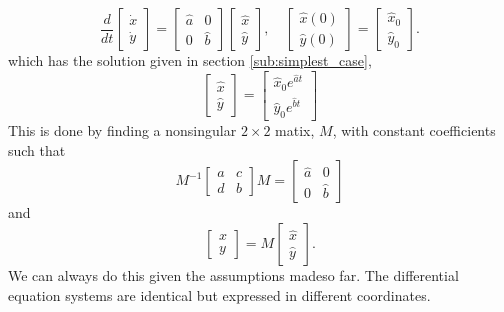 \begin{equation*}
\frac{d}{dt}
\begin{bmatrix}
\dot{x}\\
\dot{y}
\end{bmatrix}
= \begin{bmatrix}
\hat{a} & 0\\
0 & \hat{b}
\end{bmatrix}
\begin{bmatrix}
\hat{x}\\
\hat{y}
\end{bmatrix},
\quad
\begin{bmatrix}
\hat{x}(0)\\
\hat{y}(0)
\end{bmatrix}
= \begin{bmatrix}
\hat{x}_{0}\\
\hat{y}_{0}
\end{bmatrix}.
\end{equation*}
which has the solution given in section \ref{sub:simplest_case},
\begin{equation*}
\begin{bmatrix}
\hat{x}\\
\hat{y}
\end{bmatrix}
= \begin{bmatrix}
\hat{x}_{0}e^{\hat{a}t}\\
\hat{y}_{0}e^{\hat{b}t}
\end{bmatrix}
\end{equation*}
This is done by finding a nonsingular $2\times 2$ matix, $M$, with constant coefficients such that
\begin{equation*}
M^{-1}\begin{bmatrix}
a & c\\
d & b
\end{bmatrix} M
= \begin{bmatrix}
\hat{a} & 0\\
0 & \hat{b}
\end{bmatrix}
\end{equation*}
and
\begin{equation*}
\begin{bmatrix}
x\\
y
\end{bmatrix}
= M \begin{bmatrix}
\hat{x}\\
\hat{y}
\end{bmatrix}.
\end{equation*}
We can always do this given the assumptions madeso far. The differential equation systems are
identical but expressed in different coordinates.

